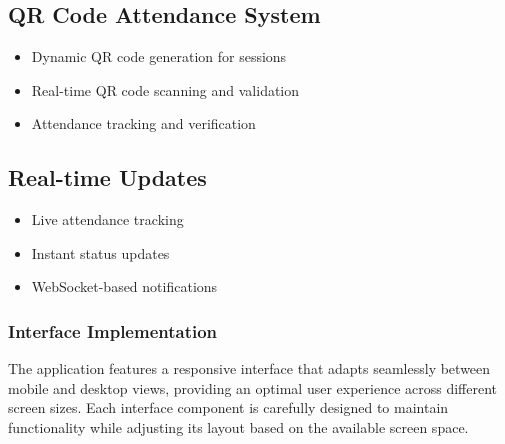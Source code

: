 \subsection{QR Code Attendance System}\nopagebreak[4]
\begin{itemize}
    \item Dynamic QR code generation for sessions
    \item Real-time QR code scanning and validation
    \item Attendance tracking and verification
\end{itemize}

\subsection{Real-time Updates}\nopagebreak[4]
\begin{itemize}
    \item Live attendance tracking
    \item Instant status updates
    \item WebSocket-based notifications
\end{itemize}

\subsubsection{Interface Implementation}
The application features a responsive interface that adapts seamlessly between mobile and desktop views, providing an optimal user experience across different screen sizes. Each interface component is carefully designed to maintain functionality while adjusting its layout based on the available screen space.

